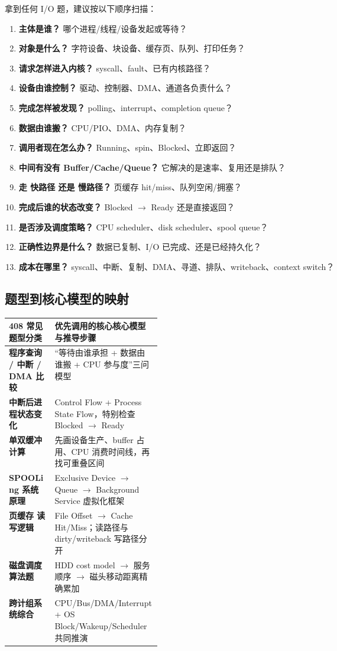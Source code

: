 \documentclass[11pt,a4paper]{ctexart}
\newcommand{\kw}[1]{\textbf{#1}}
\begin{document}
\begin{method}[I/O 十三问]
拿到任何 I/O 题，建议按以下顺序扫描：
\begin{enumerate}
  \item \kw{主体是谁？} 哪个进程/线程/设备发起或等待？
  \item \kw{对象是什么？} 字符设备、块设备、缓存页、队列、打印任务？
  \item \kw{请求怎样进入内核？} syscall、fault、已有内核路径？
  \item \kw{设备由谁控制？} 驱动、控制器、DMA、通道各负责什么？
  \item \kw{完成怎样被发现？} polling、interrupt、completion queue？
  \item \kw{数据由谁搬？} CPU/PIO、DMA、内存复制？
  \item \kw{调用者现在怎么办？} Running、spin、Blocked、立即返回？
  \item \kw{中间有没有 Buffer/Cache/Queue？} 它解决的是速率、复用还是排队？
  \item \kw{走 快路径 还是 慢路径？} 页缓存 hit/miss、队列空闲/拥塞？
  \item \kw{完成后谁的状态改变？} Blocked $\to$ Ready 还是直接返回？
  \item \kw{是否涉及调度策略？} CPU scheduler、disk scheduler、spool queue？
  \item \kw{正确性边界是什么？} 数据已复制、I/O 已完成、还是已经持久化？
  \item \kw{成本在哪里？} syscall、中断、复制、DMA、寻道、排队、writeback、context switch？
\end{enumerate}
\end{method}

\subsection{题型到核心模型的映射}
\begingroup
\small
\renewcommand{\arraystretch}{1.25}
\setlength{\tabcolsep}{6pt}
\begin{tabularx}{\linewidth}{>{\bfseries}p{0.3\linewidth} X}
\toprule
408 常见题型分类 & 优先调用的核心核心模型与推导步骤 \\
\midrule
程序查询 / 中断 / DMA 比较 & “等待由谁承担 + 数据由谁搬 + CPU 参与度”三问模型 \\
中断后进程状态变化 & Control Flow + Process State Flow，特别检查 Blocked $\rightarrow$ Ready \\
单双缓冲计算 & 先画设备生产、buffer 占用、CPU 消费时间线，再找可重叠区间 \\
SPOOLing 系统原理 & Exclusive Device $\to$ Queue $\to$ Background Service 虚拟化框架 \\
页缓存 读写逻辑 & File Offset $\to$ Cache Hit/Miss；读路径与 dirty/writeback 写路径分开 \\
磁盘调度算法题 & HDD cost model $\to$ 服务顺序 $\to$ 磁头移动距离精确累加 \\
跨计组系统综合 & CPU/Bus/DMA/Interrupt + OS Block/Wakeup/Scheduler 共同推演 \\
\bottomrule
\end{tabularx}
\endgroup
\end{document}
